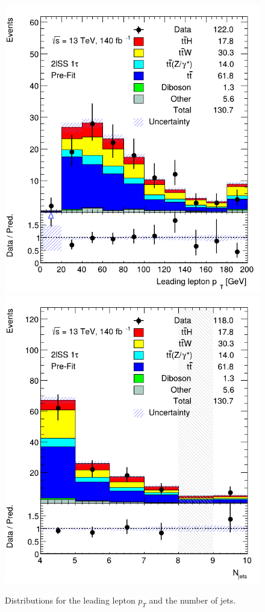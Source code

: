 \begin{figure}[ht]
    \centering
    
    \includegraphics[scale=0.3]{res/AnalysisPlots/wData/lep-pt-0.png}
    \includegraphics[scale=0.3]{res/AnalysisPlots/wData/n-jets.png}

    \caption{Distributions for the leading lepton $p_T$ and the number of jets.}
    \label{leadingLepPtAndNumJets}
\end{figure}